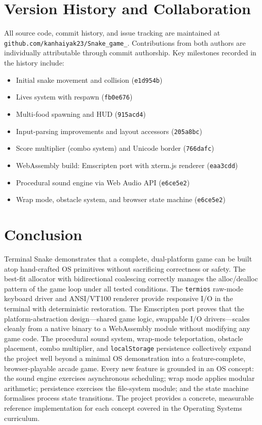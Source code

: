 \documentclass[conference]{IEEEtran}
\begin{document}
\section{Version History and Collaboration}

All source code, commit history, and issue tracking are maintained at
\texttt{github.com/kanhaiyak23/Snake\_game\_}. Contributions from both
authors are individually attributable through commit authorship.
Key milestones recorded in the history include:

\begin{itemize}
  \item Initial snake movement and collision (\texttt{e1d954b})
  \item Lives system with respawn (\texttt{fb0e676})
  \item Multi-food spawning and HUD (\texttt{915acd4})
  \item Input-parsing improvements and layout accessors (\texttt{205a8bc})
  \item Score multiplier (combo system) and Unicode border (\texttt{766dafc})
  \item WebAssembly build: Emscripten port with xterm.js renderer (\texttt{eaa3cdd})
  \item Procedural sound engine via Web Audio API (\texttt{e6ce5e2})
  \item Wrap mode, obstacle system, and browser state machine (\texttt{e6ce5e2})
\end{itemize}

\section{Conclusion}

Terminal Snake demonstrates that a complete, dual-platform game can be built
atop hand-crafted OS primitives without sacrificing correctness or safety.
The best-fit allocator with bidirectional coalescing correctly manages the
alloc/dealloc pattern of the game loop under all tested conditions. The
\texttt{termios} raw-mode keyboard driver and ANSI/VT100 renderer provide
responsive I/O in the terminal with deterministic restoration. The Emscripten
port proves that the platform-abstraction design---shared game logic, swappable
I/O drivers---scales cleanly from a native binary to a WebAssembly module
without modifying any game code. The procedural sound system, wrap-mode
teleportation, obstacle placement, combo multiplier, and \texttt{localStorage}
persistence collectively expand the project well beyond a minimal OS
demonstration into a feature-complete, browser-playable arcade game. Every
new feature is grounded in an OS concept: the sound engine exercises
asynchronous scheduling; wrap mode applies modular arithmetic; persistence
exercises the file-system module; and the state machine formalises process
state transitions. The project provides a concrete, measurable reference
implementation for each concept covered in the Operating Systems curriculum.
\end{document}
